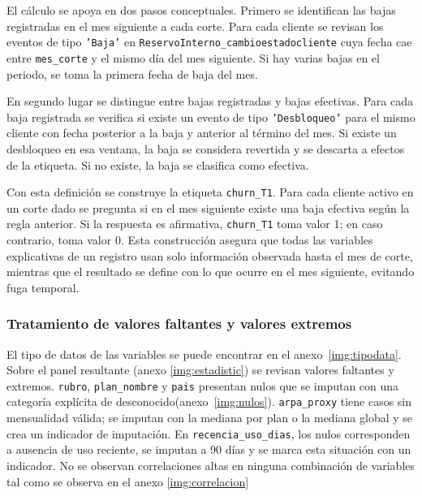 El cálculo se apoya en dos pasos conceptuales. Primero se identifican las bajas registradas en el mes siguiente a cada corte. Para cada cliente se revisan los eventos de tipo \texttt{'Baja'} en \texttt{ReservoInterno\_\hspace{0pt}cambioestadocliente} cuya fecha cae entre \texttt{mes\_\hspace{0pt}corte} y el mismo día del mes siguiente. Si hay varias bajas en el periodo, se toma la primera fecha de baja del mes.

En segundo lugar se distingue entre bajas registradas y bajas efectivas. Para cada baja registrada se verifica si existe un evento de tipo \texttt{'Desbloqueo'} para el mismo cliente con fecha posterior a la baja y anterior al término del mes. Si existe un desbloqueo en esa ventana, la baja se considera revertida y se descarta a efectos de la etiqueta. Si no existe, la baja se clasifica como efectiva.

Con esta definición se construye la etiqueta \texttt{churn\_\hspace{0pt}T1}. Para cada cliente activo en un corte dado se pregunta si en el mes siguiente existe una baja efectiva según la regla anterior. Si la respuesta es afirmativa, \texttt{churn\_\hspace{0pt}T1} toma valor 1; en caso contrario, toma valor 0. Esta construcción asegura que todas las variables explicativas de un registro usan solo información observada hasta el mes de corte, mientras que el resultado se define con lo que ocurre en el mes siguiente, evitando fuga temporal.

\subsubsection{Tratamiento de valores faltantes y valores extremos}

El tipo de datos de las variables se puede encontrar en el anexo~\ref{img:tipodata}. Sobre el panel resultante (anexo \ref{img:estadistic}) se revisan valores faltantes y extremos. \texttt{rubro}, \texttt{plan\_\hspace{0pt}nombre} y \texttt{pais} presentan nulos que se imputan con una categoría explícita de desconocido(anexo~\ref{img:nulos}). \texttt{arpa\_\hspace{0pt}proxy} tiene casos sin mensualidad válida; se imputan con la mediana por plan o la mediana global y se crea un indicador de imputación. En \texttt{recencia\_\hspace{0pt}uso\_\hspace{0pt}dias}, los nulos corresponden a ausencia de uso reciente, se imputan a 90 días y se marca esta situación con un indicador. No se observan correlaciones altas en ninguna combinación de variables tal como se observa en el anexo \ref{img:correlacion}

